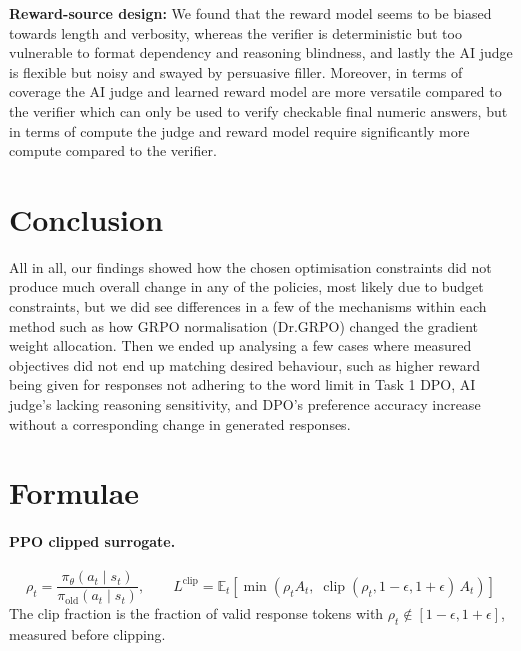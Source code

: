 \documentclass{article}
\begin{document}
 \textbf{Reward-source design:}
We found that the reward model seems to be biased towards length and verbosity, whereas the verifier is deterministic but too vulnerable to format dependency and reasoning blindness, and lastly the AI judge is flexible but noisy and swayed by persuasive filler. Moreover, in terms of coverage the AI judge and learned reward model are more versatile compared to the verifier which can only be used to verify checkable final numeric answers, but in terms of compute the judge and reward model require significantly more compute compared to the verifier.



\section{Conclusion}
\label{sec:conclusion}
 All in all, our findings showed how the chosen optimisation constraints did not produce much overall change in any of the policies, most likely due to budget constraints, but we did see differences in a few of the mechanisms within each method such as how GRPO normalisation (Dr.GRPO) changed the gradient weight allocation. Then we ended up analysing a few cases where measured objectives did not end up matching desired behaviour, such as higher reward being given for responses not adhering to the word limit in Task 1 DPO, AI judge's lacking reasoning sensitivity, and DPO's preference accuracy increase without a corresponding change in generated responses.






\appendix

\section{Formulae}
\label{app:formulae}
\paragraph{PPO clipped surrogate.}
\begin{equation*}
\rho_t = \frac{\pi_\theta(a_t \mid s_t)}{\pi_{\text{old}}(a_t \mid s_t)}, \qquad
L^{\text{clip}} = \mathbb{E}_t\left[\min\left(\rho_t A_t,\; \operatorname{clip}(\rho_t, 1-\epsilon, 1+\epsilon)\, A_t\right)\right]
\end{equation*}
The clip fraction is the fraction of valid response tokens with $\rho_t \notin [1-\epsilon, 1+\epsilon]$, measured before clipping.
\end{document}
